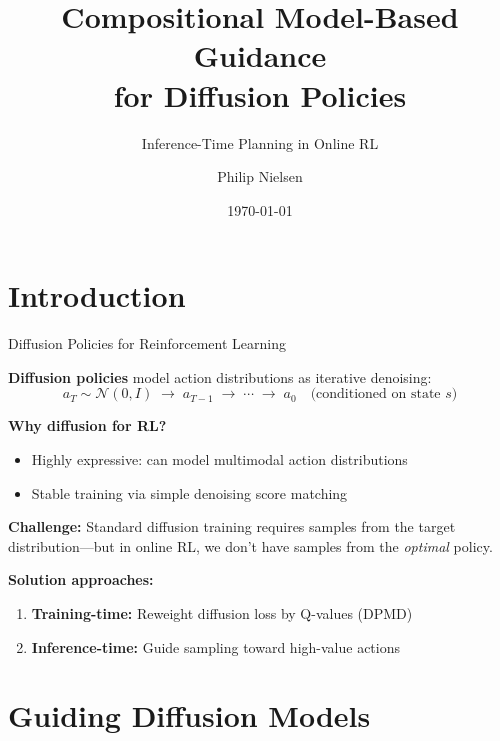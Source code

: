 \documentclass[aspectratio=169]{beamer}
\title{Compositional Model-Based Guidance\\for Diffusion Policies}
\subtitle{Inference-Time Planning in Online RL}
\author{Philip Nielsen}
\date{\today}
\institute{Harvard University}
\begin{document}
\maketitle

\section{Introduction}

\begin{frame}{Diffusion Policies for Reinforcement Learning}

\textbf{Diffusion policies} model action distributions as iterative denoising:
\[
a_T \sim \mathcal{N}(0, I) \;\to\; a_{T-1} \;\to\; \cdots \;\to\; a_0 \quad \text{(conditioned on state } s\text{)}
\]

\vspace{0.5em}
\textbf{Why diffusion for RL?}
\begin{itemize}
    \item Highly expressive: can model multimodal action distributions
    \item Stable training via simple denoising score matching
\end{itemize}

\vspace{0.5em}
\textbf{Challenge:} Standard diffusion training requires samples from the target distribution---but in online RL, we don't have samples from the \emph{optimal} policy.

\vspace{0.5em}
\textbf{Solution approaches:}
\begin{enumerate}
    \item \textbf{Training-time:} Reweight diffusion loss by Q-values (DPMD)
    \item \textbf{Inference-time:} Guide sampling toward high-value actions
\end{enumerate}

\end{frame}

\section{Guiding Diffusion Models}
\end{document}
